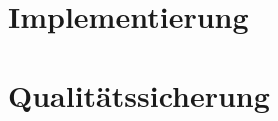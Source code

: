 \cleardoublepage
\chaptertoc %

\begin{refsection}
	
	
	\cleardoublepage %
	\printbibliography[heading=subbibliography]
\end{refsection}

\cleardoublepage
\part{Implementierung}
\label{sec:Lektion-6}
\sttpDeckblattRueckseite{\partname~\thepart}%

\cleardoublepage
\chaptertoc %

\begin{refsection}
	
	
	\cleardoublepage %
	\printbibliography[heading=subbibliography]
\end{refsection}

\cleardoublepage
\part{Qualitätssicherung}
\label{sec:Lektion-7}
\sttpDeckblattRueckseite{\partname~\thepart}%

\cleardoublepage
\chaptertoc %

\begin{refsection}
	
	
	\cleardoublepage %
	\printbibliography[heading=subbibliography]
\end{refsection}


